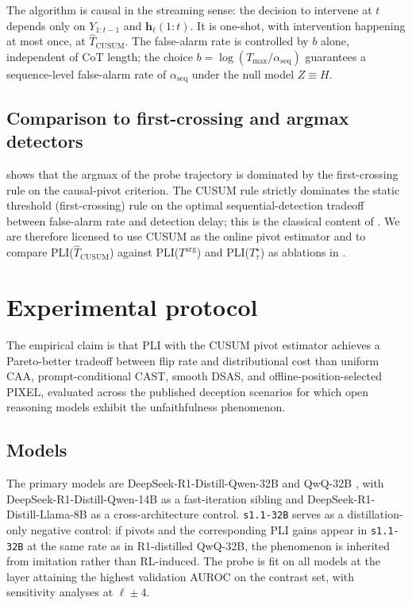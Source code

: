 \documentclass[11pt]{article}
\theoremstyle{definition}
\newcommand{\1}{\mathbf{1}}
\newcommand{\hh}{\bm{h}}
\begin{document}
The algorithm is causal in the streaming sense: the decision to intervene at $t$ depends only on $Y_{1:t-1}$ and $\hh_{\ell}(1{:}t)$. It is one-shot, with intervention happening at most once, at $\widehat{T}_{\mathrm{CUSUM}}$. The false-alarm rate is controlled by $b$ alone, independent of CoT length; the choice $b = \log(T_{\max}/\alpha_{\mathrm{seq}})$ guarantees a sequence-level false-alarm rate of $\alpha_{\mathrm{seq}}$ under the null model $Z \equiv H$.

\subsection{Comparison to first-crossing and argmax detectors}

 shows that the argmax of the probe trajectory is dominated by the first-crossing rule on the causal-pivot criterion. The CUSUM rule strictly dominates the static threshold (first-crossing) rule on the optimal sequential-detection tradeoff between false-alarm rate and detection delay; this is the classical content of \citet{lorden1971,moustakides1986}. We are therefore licensed to use CUSUM as the online pivot estimator and to compare PLI($\widehat{T}_{\mathrm{CUSUM}}$) against PLI($T^{\arg}$) and PLI($T^{\star}_{\tau}$) as ablations in .

\section{Experimental protocol}
\label{sec:protocol}

The empirical claim is that PLI with the CUSUM pivot estimator achieves a Pareto-better tradeoff between flip rate and distributional cost than uniform CAA, prompt-conditional CAST, smooth DSAS, and offline-position-selected PIXEL, evaluated across the published deception scenarios for which open reasoning models exhibit the unfaithfulness phenomenon.

\subsection{Models}

The primary models are DeepSeek-R1-Distill-Qwen-32B and QwQ-32B \citep{deepseekR1}, with DeepSeek-R1-Distill-Qwen-14B as a fast-iteration sibling and DeepSeek-R1-Distill-Llama-8B as a cross-architecture control. \texttt{s1.1-32B} \citep{muennighoff2025s1} serves as a distillation-only negative control: if pivots and the corresponding PLI gains appear in \texttt{s1.1-32B} at the same rate as in R1-distilled QwQ-32B, the phenomenon is inherited from imitation rather than RL-induced. The probe is fit on all models at the layer attaining the highest validation AUROC on the contrast set, with sensitivity analyses at $\ell \pm 4$.
\end{document}
